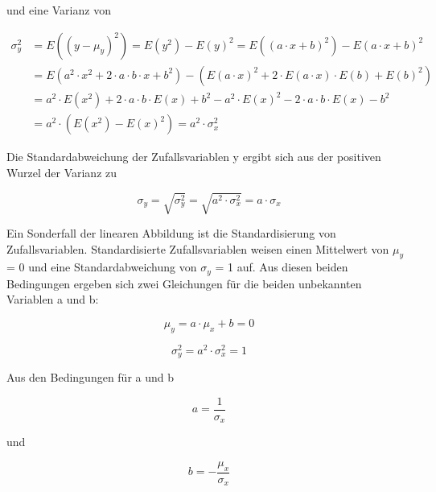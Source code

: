\noindent und eine Varianz von

\begin{equation}\label{eq:fourninetysix}
\begin{split}
\sigma _{y}^{2} & = E\left((y-\mu _{y})^{2} \right)=E\left(y^{2} \right)-E(y)^{2} =E\left((a\cdot x+b)^{2} \right)-E(a\cdot x+b)^{2}\\
& = E\left( a^{2}\cdot x^{2} + 2\cdot a\cdot b\cdot x + b^{2} \right) - \left(E(a\cdot x)^{2} + 2\cdot E(a\cdot x)\cdot E(b)+E(b)^{2} \right )\\
& = a^{2}\cdot E\left(x^{2}\right )+2\cdot a \cdot b\cdot E(x)+b^{2}-a^{2}\cdot E(x)^{2}-2\cdot a\cdot b\cdot E(x) -b^{2}\\
& = a^{2}\cdot \left(E(x^{2})-E(x)^{2}\right ) = a^{2} \cdot \sigma _{x}^{2}
\end{split}
\end{equation}

\noindent Die Standardabweichung der Zufallsvariablen y ergibt sich aus der positiven Wurzel der Varianz zu

\begin{equation}\label{eq:fourninetyseven}
\sigma _{y} =\sqrt{\sigma _{y}^{2}} =\sqrt{a^{2} \cdot \sigma _{x}^{2}} =a\cdot \sigma _{x}
\end{equation}

\noindent Ein Sonderfall der linearen Abbildung ist die Standardisierung von Zufallsvariablen. Standardisierte Zufallsvariablen weisen einen Mittelwert von $\mu_{y}$ = 0 und eine Standardabweichung von $\sigma_{y}$ = 1 auf. Aus diesen beiden Bedingungen ergeben sich zwei Gleichungen f\"{u}r die beiden unbekannten Variablen a und b:

\begin{equation}\label{eq:fourninetyeight}
\mu _{y} =a\cdot \mu _{x} +b=0
\end{equation}

\begin{equation}\label{eq:fourninetynine}
\sigma _{y}^{2} =a^{2} \cdot \sigma _{x}^{2} =1
\end{equation}

\noindent Aus den Bedingungen f\"{u}r a und b 

\begin{equation}\label{eq:fourhundred}
a=\dfrac{1}{\sigma _{x}}
\end{equation}

\noindent und 

\begin{equation}\label{eq:fourhundredone}
b=-\dfrac{\mu _{x} }{\sigma _{x}}
\end{equation}

